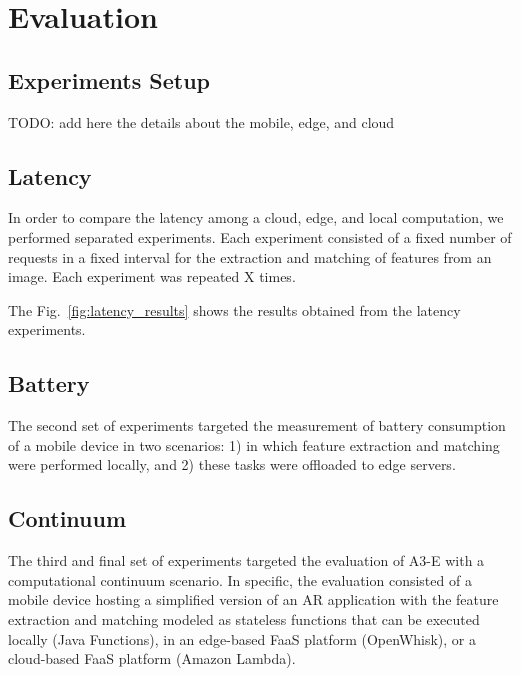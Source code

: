 \section{Evaluation}\label{sec:evaluation}

\subsection{Experiments Setup}

TODO: add here the details about the mobile, edge, and cloud

\subsection{Latency} In order to compare the latency among a cloud, edge, and local computation, we performed separated experiments. Each experiment consisted of a fixed number of requests in a fixed interval for the extraction and matching of features from an image. Each experiment was repeated X times.


The Fig.~\ref{fig:latency_results} shows the results obtained from the latency experiments. 


\subsection{Battery} The second set of experiments targeted the measurement of battery consumption of a mobile device in two scenarios: 1) in which feature extraction and matching were performed locally, and 2) these tasks were offloaded to edge servers.

\subsection{Continuum} The third and final set of experiments targeted the evaluation of A3-E with a computational continuum scenario. In specific, the evaluation consisted of a mobile device hosting a simplified version of an AR application with the feature extraction and matching modeled as stateless functions that can be executed locally (Java Functions), in an edge-based FaaS platform (OpenWhisk), or a cloud-based FaaS platform (Amazon Lambda).